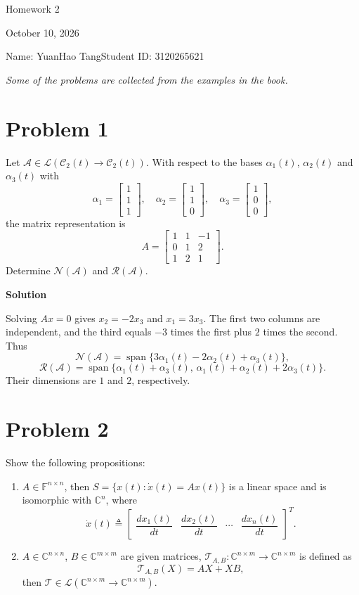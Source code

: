 \documentclass[UTF8,10pt,letterpaper,fontset=fandol]{ctexart}
\newcommand{\C}{\mathbb C}
\newcommand{\F}{\mathbb F}
\newcommand{\Span}{\operatorname{span}}
\newcommand{\Solution}{\par\Needspace{5\baselineskip}\textbf{Solution}\par}
\begin{document}
\begin{center}
{\LARGE Homework 2}\par
\vspace{0.6em}
October 10, 2026\par
Name: YuanHao Tang\quad Student ID: 3120265621
\end{center}
\begin{center}\emph{Some of the problems are collected from the examples in the book.}\end{center}

\section{Problem 1}
Let \(\mathcal A\in\mathcal L(\mathcal C_2(t)\to\mathcal C_2(t))\).
With respect to the bases \(\alpha_1(t)\), \(\alpha_2(t)\) and \(\alpha_3(t)\) with
\[
\alpha_1=\begin{bmatrix}1\\1\\1\end{bmatrix},\quad
\alpha_2=\begin{bmatrix}1\\1\\0\end{bmatrix},\quad
\alpha_3=\begin{bmatrix}1\\0\\0\end{bmatrix},
\]
the matrix representation is
\[
A=\begin{bmatrix}1&1&-1\\0&1&2\\1&2&1\end{bmatrix}.
\]
Determine \(\mathcal N(\mathcal A)\) and \(\mathcal R(\mathcal A)\).

\Solution
Solving \(Ax=0\) gives \(x_2=-2x_3\) and \(x_1=3x_3\). The first two columns
are independent, and the third equals \(-3\) times the first plus \(2\) times the second. Thus
\[
\boxed{\mathcal N(\mathcal A)=\Span\{3\alpha_1(t)-2\alpha_2(t)+\alpha_3(t)\}},
\]
\[
\boxed{\mathcal R(\mathcal A)=\Span\{\alpha_1(t)+\alpha_3(t),\,
\alpha_1(t)+\alpha_2(t)+2\alpha_3(t)\}}.
\]
Their dimensions are \(1\) and \(2\), respectively.

\section{Problem 2}
Show the following propositions:
\begin{enumerate}
\item \(A\in\F^{n\times n}\), then \(S=\{x(t):\dot x(t)=Ax(t)\}\) is a linear space
and is isomorphic with \(\C^n\), where
\[
\dot x(t)\triangleq
\begin{bmatrix}\dfrac{dx_1(t)}{dt}&\dfrac{dx_2(t)}{dt}&\cdots&\dfrac{dx_n(t)}{dt}\end{bmatrix}^{T}.
\]
\item \(A\in\C^{n\times n}\), \(B\in\C^{m\times m}\) are given matrices,
\(\mathcal T_{A,B}:\C^{n\times m}\to\C^{n\times m}\) is defined as
\[
\mathcal T_{A,B}(X)=AX+XB,
\]
then \(\mathcal T\in\mathcal L(\C^{n\times m}\to\C^{n\times m})\).
\end{enumerate}
\end{document}

